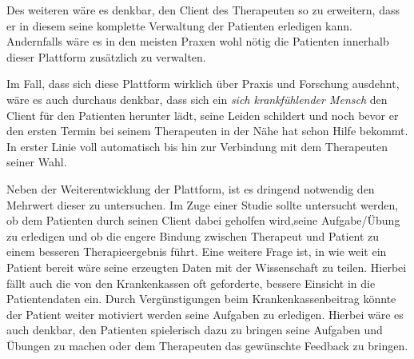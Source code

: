 Des weiteren wäre es denkbar, den Client des Therapeuten so zu erweitern, dass er in diesem seine komplette Verwaltung der Patienten erledigen kann. Andernfalls wäre es in den meisten Praxen wohl nötig die Patienten innerhalb dieser Plattform zusätzlich zu verwalten. 

Im Fall, dass sich diese Plattform wirklich über Praxis und Forschung ausdehnt, wäre es auch durchaus denkbar, dass sich ein \textit{sich krankfühlender Mensch} den Client für den Patienten herunter lädt, seine Leiden schildert und noch bevor er den ersten Termin bei seinem Therapeuten in der Nähe hat schon Hilfe bekommt. In erster Linie voll automatisch bis hin zur Verbindung mit dem Therapeuten seiner Wahl.

Neben der Weiterentwicklung der Plattform, ist es dringend notwendig den Mehrwert dieser zu untersuchen. Im Zuge einer Studie sollte untersucht werden, ob dem Patienten durch seinen Client dabei geholfen wird,seine Aufgabe/Übung zu erledigen und ob die engere Bindung zwischen Therapeut und Patient zu einem besseren Therapieergebnis führt.
Eine weitere Frage ist, in wie weit ein Patient bereit wäre seine erzeugten Daten mit der Wissenschaft zu teilen. Hierbei fällt auch die von den Krankenkassen oft geforderte, bessere Einsicht in die Patientendaten ein. Durch Vergünstigungen beim Krankenkassenbeitrag könnte der Patient weiter motiviert werden seine Aufgaben zu erledigen. Hierbei wäre es auch denkbar, den Patienten spielerisch dazu zu bringen seine Aufgaben und Übungen zu machen oder dem Therapeuten das gewünschte Feedback zu bringen.
